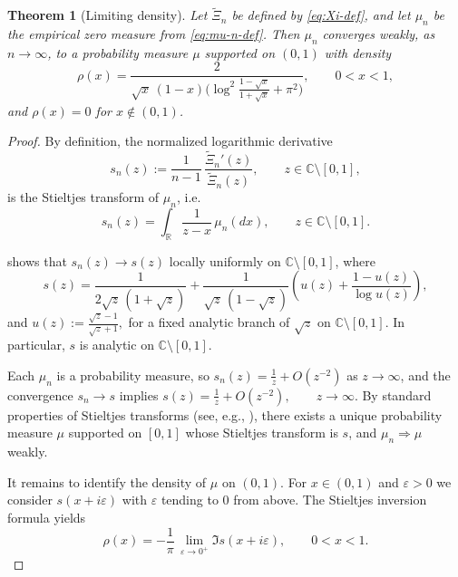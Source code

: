 \documentclass[12pt,twoside]{article}
\newtheorem{theorem}{Theorem}[section]
\begin{document}
\begin{theorem}[Limiting density]\label{thm:limiting-density}
Let $\widetilde{\Xi}_n$ be defined by \eqref{eq:Xi-def}, and let
$\mu_n$ be the empirical zero measure from \eqref{eq:mu-n-def}.
Then $\mu_n$ converges weakly, as $n\to\infty$, to a probability measure
$\mu$ supported on $(0,1)$ with density
\begin{equation}\label{eq:rho-density}
  \rho(x)
  =
  \frac{2}{
    \sqrt{x}\,(1-x)
    \bigl(\log^2\!\frac{1-\sqrt{x}}{1+\sqrt{x}} + \pi^2\bigr)
  },
  \qquad 0<x<1,
\end{equation}
and $\rho(x)=0$ for $x\notin(0,1)$.
\end{theorem}

\begin{proof}
By definition, the normalized logarithmic derivative
\[
  s_n(z) := \frac{1}{n-1}\,\frac{\widetilde{\Xi}_n'(z)}{\widetilde{\Xi}_n(z)},
  \qquad z\in\mathbb{C}\setminus[0,1],
\]
is the Stieltjes transform of $\mu_n$, i.e.
\[
  s_n(z) = \int_{\mathbb{R}} \frac{1}{z-x}\,\mu_n(dx),
  \qquad z\in\mathbb{C}\setminus[0,1].
\]

 shows that $s_n(z)\to s(z)$ locally uniformly on
$\mathbb{C}\setminus[0,1]$, where
\begin{equation}\label{eq:s-limit}
  s(z)
  =
  \frac{1}{2\sqrt{z}\,(1+\sqrt{z})}
  +
  \frac{1}{\sqrt{z}\,(1-\sqrt{z})}
  \left(
    u(z) + \frac{1-u(z)}{\log u(z)}
  \right),
\end{equation}
and
\(\displaystyle
  u(z):=\frac{\sqrt{z}-1}{\sqrt{z}+1},
\)
for a fixed analytic branch of $\sqrt{z}$ on $\mathbb{C}\setminus[0,1]$.
In particular, $s$ is analytic on $\mathbb{C}\setminus[0,1]$.

Each $\mu_n$ is a probability measure, so
$s_n(z) = \frac{1}{z} + O(z^{-2})$ as $z\to\infty$, and the convergence
$s_n\to s$ implies
\(\displaystyle
  s(z) = \frac{1}{z} + O(z^{-2}), \qquad z\to\infty.
\)
By standard properties of Stieltjes transforms (see, e.g.,
\cite[Chap.~III]{Billingsley-convergence}), there exists a unique
probability measure $\mu$ supported on $[0,1]$ whose Stieltjes
transform is $s$, and $\mu_n\Rightarrow\mu$ weakly.

It remains to identify the density of $\mu$ on $(0,1)$.  
For $x\in(0,1)$ and $\varepsilon>0$ we consider $s(x+i\varepsilon)$
with $\varepsilon$ tending to $0$ from above.  
The Stieltjes inversion formula yields
\[
  \rho(x)
  = -\frac{1}{\pi}\,\lim_{\varepsilon\rightarrow 0^+}\Im s(x+i\varepsilon),
  \qquad 0<x<1.
\]


\end{proof}
\end{document}
